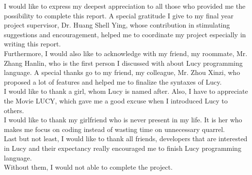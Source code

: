 
I would like to express my deepest appreciation to all those who provided me the possibility to complete this report. A special gratitude I give to my final year project supervisor, Dr. Huang Shell Ying, whose contribution in stimulating suggestions and encouragement, helped me to coordinate my project especially in writing this report. \\
Furthermore, I would also like to acknowledge with my friend, my roommate, Mr. Zhang Hanlin, who is the first person I discussed with about Lucy programming language. A special thanks go to my friend, my colleague, Mr. Zhou Xinzi, who proposed a lot of features and helped me to finalize the syntaxes of Lucy. \\
I would like to thank a girl, whom Lucy is named after. Also, I have to appreciate the Movie LUCY, which gave me a good excuse when I introduced Lucy to others. \\
I would like to thank my girlfriend who is never present in my life. It is her who makes me focus on coding instead of wasting time on unnecessary quarrel. \\
Last but not least, I would like to thank all friends, developers that are interested in Lucy and their expectancy really encouraged me to finish Lucy programming language. \\
Without them, I would not able to complete the project.
